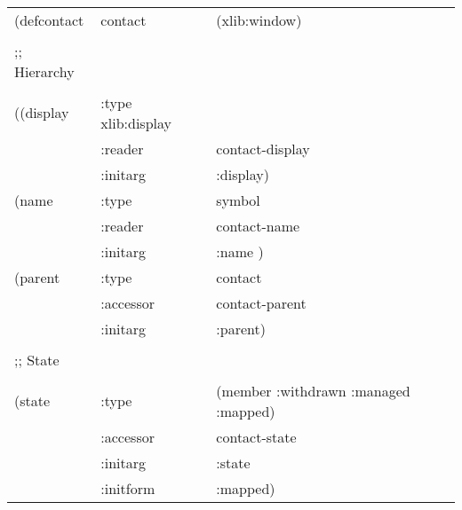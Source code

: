 \documentclass[twoside]{book}
\begin{document}
\begin{sloppy}
\begin{flushright}
\parbox[t]{6.125in}{
\tt
\begin{tabular}{lll}
\raggedright
(defcontact & contact & (xlib:window) \\
&\\
;; Hierarchy \\
&\\
  ((display &            :type xlib:display \\
&                        :reader & contact-display \\
&                        :initarg &  :display) \\
   (name &               :type & symbol \\
&                        :reader &  contact-name \\
&                        :initarg &  :name ) \\
   (parent &             :type & contact \\
&                        :accessor &  contact-parent \\
&                        :initarg &  :parent)\\
&\\
;; State \\
&\\
   (state &          :type & (member :withdrawn :managed :mapped)\\
&                        :accessor & contact-state \\
&                        :initarg &  :state \\
&                        :initform & :mapped) 
\end{tabular}}


\end{flushright}
\end{sloppy}
\end{document}
